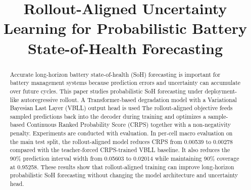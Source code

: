 \documentclass[conference]{IEEEtran}
\begin{document}
\title{Rollout-Aligned Uncertainty Learning for Probabilistic Battery State-of-Health Forecasting}

\author{
\and
{}
\and
{}
}

\maketitle

\begin{abstract}
Accurate long-horizon battery state-of-health (SoH) forecasting is important
for battery management systems because prediction errors and uncertainty can
accumulate over future cycles. This paper studies probabilistic SoH forecasting
under deployment-like autoregressive rollout. A Transformer-based
degradation model with a Variational Bayesian Last Layer (VBLL) output head is used
The rollout-aligned objective feeds sampled predictions back into the decoder
during training and optimizes a sample-based Continuous Ranked Probability
Score (CRPS) together with a non-negativity penalty. Experiments are conducted with evaluation. In per-cell macro evaluation on the main test split, the
rollout-aligned model reduces CRPS from 0.00539 to 0.00278 compared with the
teacher-forced CRPS-trained VBLL baseline. It also reduces the 90\% prediction
interval width from 0.05603 to 0.02014 while maintaining 90\% coverage at
0.95258. These results show that rollout-aligned training can improve
long-horizon probabilistic SoH forecasting without changing the model
architecture and uncertainty head.
\end{abstract}
\end{document}

